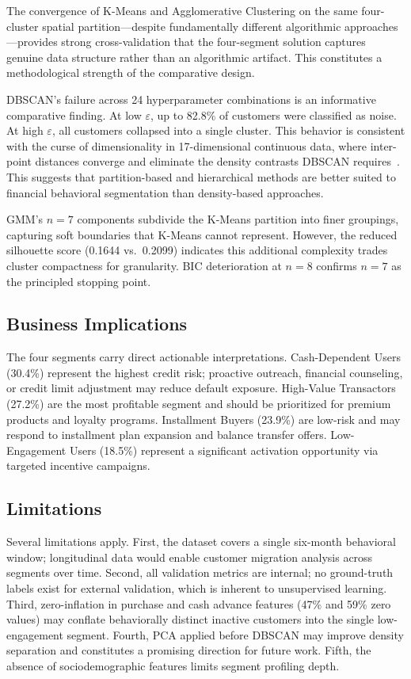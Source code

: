 \documentclass[conference]{IEEEtran}
\begin{document}
The convergence of K-Means and Agglomerative Clustering on the same
four-cluster spatial partition---despite fundamentally different
algorithmic approaches---provides strong cross-validation that the
four-segment solution captures genuine data structure rather than an
algorithmic artifact. This constitutes a methodological strength of
the comparative design.

DBSCAN's failure across 24 hyperparameter combinations is an
informative comparative finding. At low $\varepsilon$, up to 82.8\%
of customers were classified as noise. At high $\varepsilon$, all
customers collapsed into a single cluster. This behavior is consistent
with the curse of dimensionality in 17-dimensional continuous data,
where inter-point distances converge and eliminate the density
contrasts DBSCAN requires~\cite{xu2015comprehensive}. This suggests
that partition-based and hierarchical methods are better suited to
financial behavioral segmentation than density-based approaches.

GMM's $n{=}7$ components subdivide the K-Means partition into finer
groupings, capturing soft boundaries that K-Means cannot represent.
However, the reduced silhouette score (0.1644 vs.\ 0.2099) indicates
this additional complexity trades cluster compactness for
granularity. BIC deterioration at $n{=}8$ confirms $n{=}7$ as the
principled stopping point.

\subsection{Business Implications}

The four segments carry direct actionable interpretations.
Cash-Dependent Users (30.4\%) represent the highest credit risk;
proactive outreach, financial counseling, or credit limit adjustment
may reduce default exposure. High-Value Transactors (27.2\%) are the
most profitable segment and should be prioritized for premium products
and loyalty programs. Installment Buyers (23.9\%) are low-risk and
may respond to installment plan expansion and balance transfer offers.
Low-Engagement Users (18.5\%) represent a significant activation
opportunity via targeted incentive campaigns.

\subsection{Limitations}

Several limitations apply. First, the dataset covers a single
six-month behavioral window; longitudinal data would enable customer
migration analysis across segments over time. Second, all validation
metrics are internal; no ground-truth labels exist for external
validation, which is inherent to unsupervised learning. Third,
zero-inflation in purchase and cash advance features (47\% and 59\%
zero values) may conflate behaviorally distinct inactive customers
into the single low-engagement segment. Fourth, PCA applied before
DBSCAN may improve density separation and constitutes a promising
direction for future work. Fifth, the absence of sociodemographic
features limits segment profiling depth.
\end{document}
